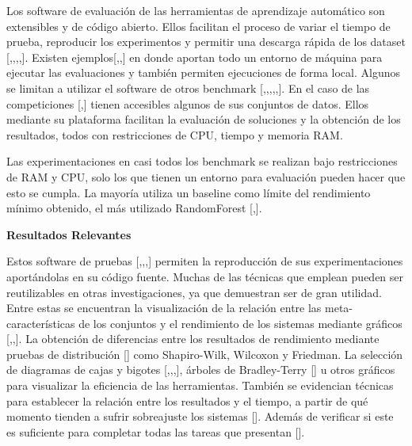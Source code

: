 Los software de evaluación de las herramientas de aprendizaje automático son extensibles y de código abierto. Ellos facilitan el proceso de variar el tiempo de 
prueba, reproducir los experimentos y permitir una descarga rápida de los dataset [\cite{10},\cite{15},\cite{23},\cite{28},\cite{31}].
Existen ejemplos[\cite{10},\cite{15},\cite{31}] en donde aportan todo un entorno de máquina para ejecutar las evaluaciones y también permiten ejecuciones de forma 
local. Algunos se limitan a utilizar el software de otros benchmark [\cite{17},\cite{19},\cite{20},\cite{21},\cite{26},\cite{32}]. En el caso de las 
competiciones [\cite{11},\cite{29}] tienen accesibles algunos de sus conjuntos de datos. Ellos mediante su plataforma facilitan la evaluación de soluciones y la 
obtención de los resultados, todos con restricciones de CPU, tiempo y memoria RAM.

Las experimentaciones en casi todos los benchmark se realizan bajo restricciones de RAM y CPU, solo los que tienen un entorno para evaluación pueden hacer que esto 
se cumpla. La mayoría utiliza un baseline como límite del rendimiento mínimo obtenido, el más utilizado RandomForest [\cite{29},\cite{31}].

\begin{flushleft} 
    {\large { \textbf{Resultados Relevantes}}}\label{subsection:result_AutoML}
\end{flushleft}

Estos software de pruebas [\cite{10},\cite{15},\cite{23},\cite{31}] permiten la reproducción de sus experimentaciones aportándolas en su código fuente. Muchas de 
las técnicas que emplean pueden ser reutilizables en otras investigaciones, ya que demuestran ser de gran utilidad. Entre estas se encuentran la visualización de la 
relación entre las meta-características de los conjuntos y el rendimiento de los sistemas mediante gráficos [\cite{10},\cite{26},\cite{30}]. La obtención de 
diferencias entre los resultados de rendimiento mediante pruebas de distribución [\cite{18}] como Shapiro-Wilk, Wilcoxon y Friedman. La selección de diagramas de 
cajas y bigotes [\cite{10},\cite{16},\cite{22},\cite{31}], árboles de Bradley-Terry [\cite{31}] u otros gráficos para visualizar la eficiencia de las herramientas. 
También se evidencian técnicas para establecer la relación entre los resultados y el tiempo, a partir de qué momento tienden a sufrir sobreajuste los sistemas 
[\cite{15}]. Además de verificar si este es suficiente para completar todas las tareas que presentan [\cite{29}].

